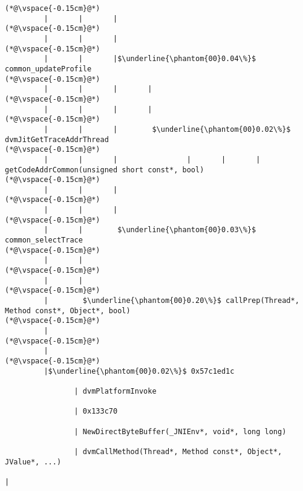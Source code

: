\begin{lstlisting}[caption=NewDirectByteBuffer, label=profile:C2JNewDirectBuffer-512, numberbychapter=true, frame=lines, float, floatplacement=t]
(*@\vspace{-0.15cm}@*)
         |       |       |
(*@\vspace{-0.15cm}@*)
         |       |       |
(*@\vspace{-0.15cm}@*)
         |       |       |$\underline{\phantom{00}0.04\%}$ common_updateProfile
(*@\vspace{-0.15cm}@*)
         |       |       |       |
(*@\vspace{-0.15cm}@*)
         |       |       |       |
(*@\vspace{-0.15cm}@*)
         |       |       |        $\underline{\phantom{00}0.02\%}$ dvmJitGetTraceAddrThread
(*@\vspace{-0.15cm}@*)
         |       |       |                |       |       |               getCodeAddrCommon(unsigned short const*, bool)
(*@\vspace{-0.15cm}@*)
         |       |       |
(*@\vspace{-0.15cm}@*)
         |       |       |
(*@\vspace{-0.15cm}@*)
         |       |        $\underline{\phantom{00}0.03\%}$ common_selectTrace
(*@\vspace{-0.15cm}@*)
         |       |
(*@\vspace{-0.15cm}@*)
         |       |
(*@\vspace{-0.15cm}@*)
         |        $\underline{\phantom{00}0.20\%}$ callPrep(Thread*, Method const*, Object*, bool)
(*@\vspace{-0.15cm}@*)
         |
(*@\vspace{-0.15cm}@*)
         |
(*@\vspace{-0.15cm}@*)
         |$\underline{\phantom{00}0.02\%}$ 0x57c1ed1c

                | dvmPlatformInvoke

                | 0x133c70

                | NewDirectByteBuffer(_JNIEnv*, void*, long long)

                | dvmCallMethod(Thread*, Method const*, Object*, JValue*, ...)

| 



\end{lstlisting}

